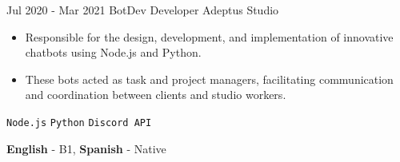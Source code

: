 \documentclass[9pt]{developercv}
\begin{document}
\begin{entrylist}
        \entry
		{Jul 2020 - Mar 2021}
		{BotDev Developer}
		{Adeptus Studio}
		{\vspace{-10pt}
        \begin{itemize}[noitemsep,topsep=0pt,parsep=0pt,partopsep=0pt, leftmargin=-1pt]
            \item Responsible for the design, development, and implementation of innovative chatbots using Node.js and Python.
            \item These bots acted as task and project managers, facilitating communication and coordination between clients and studio workers.
        \end{itemize} 
        \texttt{Node.js} \slashsep \texttt{Python} \slashsep \texttt{Discord API}}
\end{entrylist}

\vspace{-10 pt}
    \vspace{-6pt}
    
    \hspace{26mm} \textbf{English} - B1, \textbf{ Spanish} - Native
\end{document}

